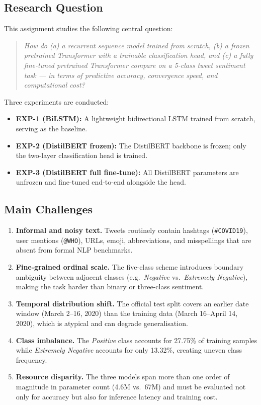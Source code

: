 \subsection{Research Question}

This assignment studies the following central question:

\begin{quote}
    \textit{How do (a) a recurrent sequence model trained from scratch, (b) a frozen pretrained Transformer with a trainable classification head, and (c) a fully fine-tuned pretrained Transformer compare on a 5-class tweet sentiment task — in terms of predictive accuracy, convergence speed, and computational cost?}
\end{quote}

Three experiments are conducted:
\begin{itemize}
    \item \textbf{EXP-1 (BiLSTM):} A lightweight bidirectional LSTM trained from scratch, serving as the baseline.
    \item \textbf{EXP-2 (DistilBERT frozen):} The DistilBERT backbone is frozen; only the two-layer classification head is trained.
    \item \textbf{EXP-3 (DistilBERT full fine-tune):} All DistilBERT parameters are unfrozen and fine-tuned end-to-end alongside the head.
\end{itemize}

\subsection{Main Challenges}

\begin{enumerate}
    \item \textbf{Informal and noisy text.} Tweets routinely contain hashtags (\texttt{\#COVID19}), user mentions (\texttt{@WHO}), URLs, emoji, abbreviations, and misspellings that are absent from formal NLP benchmarks.
    \item \textbf{Fine-grained ordinal scale.} The five-class scheme introduces boundary ambiguity between adjacent classes (e.g.\ \textit{Negative} vs.\ \textit{Extremely Negative}), making the task harder than binary or three-class sentiment.
    \item \textbf{Temporal distribution shift.} The official test split covers an earlier date window (March 2--16, 2020) than the training data (March 16--April 14, 2020), which is atypical and can degrade generalisation.
    \item \textbf{Class imbalance.} The \textit{Positive} class accounts for 27.75\% of training samples while \textit{Extremely Negative} accounts for only 13.32\%, creating uneven class frequency.
    \item \textbf{Resource disparity.} The three models span more than one order of magnitude in parameter count (4.6M vs.\ 67M) and must be evaluated not only for accuracy but also for inference latency and training cost.
\end{enumerate}
